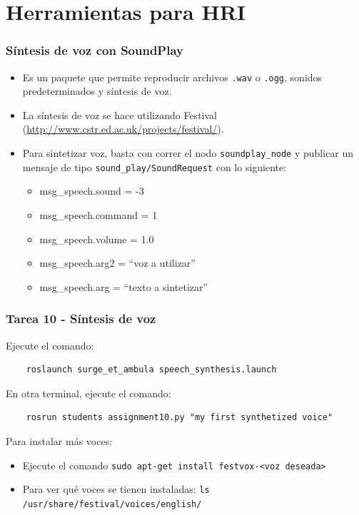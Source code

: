 \section{Herramientas para HRI}

\begin{frame}\frametitle{Síntesis de voz con SoundPlay}
  \begin{itemize}
  \item Es un paquete que permite reproducir archivos \texttt{.wav} o \texttt{.ogg}, sonidos predeterminados y síntesis de voz.
  \item La síntesis de voz se hace utilizando Festival (\url{http://www.cstr.ed.ac.uk/projects/festival/}).
  \item Para sintetizar voz, basta con correr el nodo \texttt{soundplay\_node} y publicar un mensaje de tipo \texttt{sound\_play/SoundRequest} con lo siguiente:
    \begin{itemize}
    \item msg\_speech.sound   = -3                 
    \item msg\_speech.command = 1                  
    \item msg\_speech.volume  = 1.0                
    \item msg\_speech.arg2    = ``voz a utilizar''
    \item msg\_speech.arg = ``texto a sintetizar''
    \end{itemize}
  \end{itemize}
\end{frame}

\begin{frame}[containsverbatim]\frametitle{Tarea 10 - Síntesis de voz}
  Ejecute el comando:
  \begin{lstlisting}
    roslaunch surge_et_ambula speech_synthesis.launch
  \end{lstlisting}
  En otra terminal, ejecute el comando:
  \begin{lstlisting}
    rosrun students assignment10.py "my first synthetized voice"
  \end{lstlisting}
  Para instalar más voces:
  \begin{itemize}
  \item Ejecute el comando \texttt{sudo apt-get install festvox-<voz deseada>}
  \item Para ver qué voces se tienen instaladas: \texttt{ls /usr/share/festival/voices/english/}
  \end{itemize}
\end{frame}

